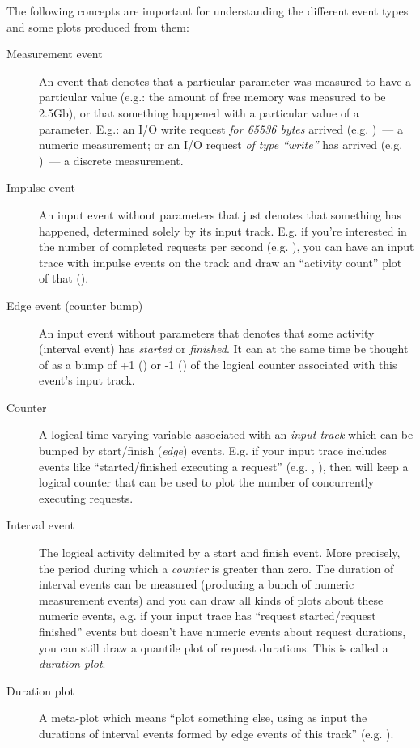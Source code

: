 \documentclass{article}
\begin{document}
The following concepts are important for understanding the different event types and some plots produced from them:
\begin{description}
\item[Measurement event] An event that denotes that a particular parameter was measured to have a particular value (e.g.: the amount of free memory was measured to be 2.5Gb), or that something happened with a particular value of a parameter. E.g.: an I/O write request \emph{for 65536 bytes} arrived (e.g. )~--- a numeric measurement; or an I/O request \emph{of type ``write''} has arrived (e.g. )~--- a discrete measurement.
\item[Impulse event] An input event without parameters that just denotes that something has happened, determined solely by its input track. E.g. if you're interested in the number of completed requests per second (e.g. ), you can have an input trace with impulse events on the track  and draw an ``activity count'' plot of that ().
\item[Edge event (counter bump)] An input event without parameters that denotes that some activity (interval event) has \emph{started} or \emph{finished}. It can at the same time be thought of as a bump of +1 () or -1 () of the logical counter associated with this event's input track.
\item[Counter] A logical time-varying variable associated with an \emph{input track} which can be bumped by start/finish (\emph{edge}) events. E.g. if your input trace includes events like ``started/finished executing a request'' (e.g. , ), then \timeplot{} will keep a logical counter that can be used to plot the number of concurrently executing requests.
\item[Interval event] The logical activity delimited by a start and finish event. More precisely, the period during which a \emph{counter} is greater than zero. The duration of interval events can be measured (producing a bunch of numeric measurement events) and you can draw all kinds of plots about these numeric events, e.g. if your input trace has ``request started/request finished'' events but doesn't have numeric events about request durations, you can still draw a quantile plot of request durations. This is called a \emph{duration plot}.
\item[Duration plot] A meta-plot which means ``plot something else, using as input the durations of interval events formed by edge events of this track'' (e.g. ).
\end{description}
\end{document}
